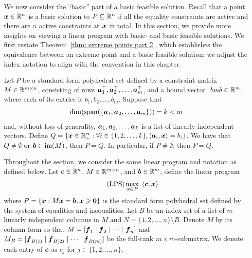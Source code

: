 We now consider the ``basic'' part of a basic feasible solution. Recall that a point ${\boldsymbol x} \in \mathbb R^n$ is a basic solution to $P\subseteq \mathbb R^n$ if all the equality constraints are active and there are $n$ active constraints at ${\boldsymbol x}$ in total. In this section, we provide more insights on viewing a linear program with basic- and basic feasible solutions. We first restate Theorem~\ref{thm: extreme points part 2}, which establishes the equivalence between an extreme point and a basic feasible solution; we adjust the index notation to align with the convention in this chapter. 

\begin{theorem}\label{thm: full rank bfs}
Let $P$ be a standard form polyhedral set defined by a constraint matrix $M \in \mathbb R^{m\times n}$, consisting of rows ${\boldsymbol a}_1^\top, {\boldsymbol a}_2^\top, \dots, {\boldsymbol a}_m^\top$, and a bound vector $ \ bmb\in\rr^m$, where each of its entries is $b_1, b_2, \dots, b_m$. Suppose that \[\dim(\operatorname{span}(\{{\boldsymbol a}_1, {\boldsymbol a}_2, \dots, {\boldsymbol a}_m\})) = k < m\] and, without loss of generality, ${\boldsymbol a}_1, {\boldsymbol a}_2, \dots, {\boldsymbol a}_k$ is a list of linearly independent vectors. Define $Q = \{{\boldsymbol x}\in\mathbb R^n_+:\forall i\in\{1,2,\dots, k\}, \left\langle{\boldsymbol a}_i, {\boldsymbol x}\right\rangle  = b_i\}$. We have that $Q \neq \emptyset$ or ${\boldsymbol b}\in \operatorname{im}(M)$, then $P = Q$. In particular, if $P\neq\emptyset$, then $P = Q$. \hfill\qedsymbol
\end{theorem}

\begin{assumption}\label{assumption: lps}
Throughout the section, we consider the same linear program and notation as defined below. Let ${\boldsymbol c} \in \mathbb R^n$, $M\in\mathbb R^{m\times n}$, and ${\boldsymbol b} \in \mathbb R^m$, define the linear program 
\begin{equation}\tag{LPS}\label{lps} 
\max_{{\boldsymbol x}\in P }~\left\langle{\boldsymbol c}, {\boldsymbol x}\right\rangle\\ 
\end{equation}
where $P =  \{{\boldsymbol x}: M {\boldsymbol x} = {\boldsymbol b}, {\boldsymbol x}\geqslant \boldsymbol0\}$ is the standard form polyhedral set defined by the system of equalities and inequalities. Let $B$ be an index set of a list of $m$ linearly independent columns in $M$ and $N = \{1,2, \dots, n\} \setminus B$. Denote $M$ by its column form so that $M = [{\boldsymbol f}_1 \mid {\boldsymbol f}_2 \mid \dots \mid {\boldsymbol f}_n]$ and $M_B = [{\boldsymbol f}_{B(1)} \mid {\boldsymbol f}_{B(2)} \mid \dots \mid {\boldsymbol f}_{B(m)}]$ be the full-rank $m\times m$-submatrix. We denote each entry of ${\boldsymbol c}$ as $c_j$ for $j\in\{1, 2, \dots, n\}$. 
\end{assumption}

